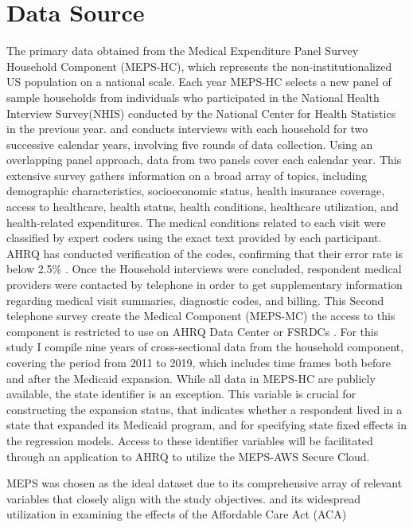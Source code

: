 \documentclass[../main.tex]{subfiles}
\begin{document}
\section{Data Source}

The primary data obtained from the Medical Expenditure Panel Survey Household Component (MEPS-HC), which represents the non-institutionalized US population on a national scale. Each year MEPS-HC selects a new panel of sample households from individuals who participated in the National Health Interview Survey(NHIS) conducted by the National Center for Health Statistics in the previous year.  and conducts interviews with each household for two successive calendar years, involving five rounds of data collection. Using an overlapping panel approach, data from two panels cover each calendar year. This extensive survey gathers information on a broad array of topics, including demographic characteristics, socioeconomic status, health insurance coverage, access to healthcare, health status,  health conditions, healthcare utilization, and health-related expenditures\parencite{ahrq_medical_2024}.
The medical conditions related to each visit were classified by expert coders using the exact text provided by each participant. AHRQ has conducted verification of the codes, confirming that their error rate is below 2.5\% \parencite{wang_fewer_2018}. Once the Household interviews were concluded, respondent medical providers were contacted by telephone in order to get supplementary information regarding medical visit summaries, diagnostic codes, and billing. This Second telephone survey create the Medical Component (MEPS-MC) the access to this component is restricted to use on AHRQ Data Center or FSRDCs \parencite{ahrq_medical_2024}. For this study I compile nine years of cross-sectional data from the household component, covering the period from 2011 to 2019, which includes time frames both before and after the Medicaid expansion. While all data in MEPS-HC are publicly available, the state identifier is an exception. This variable is crucial for constructing the expansion status, that indicates whether a respondent lived in a state that expanded its Medicaid program, and for specifying state fixed effects in the regression models. Access to these identifier variables will be facilitated through an application to AHRQ to utilize the MEPS-AWS Secure Cloud.

MEPS was chosen as the ideal dataset due to its comprehensive array of relevant variables that closely align with the study objectives. and its widespread utilization in examining the effects of the Affordable Care Act (ACA)
\end{document}
